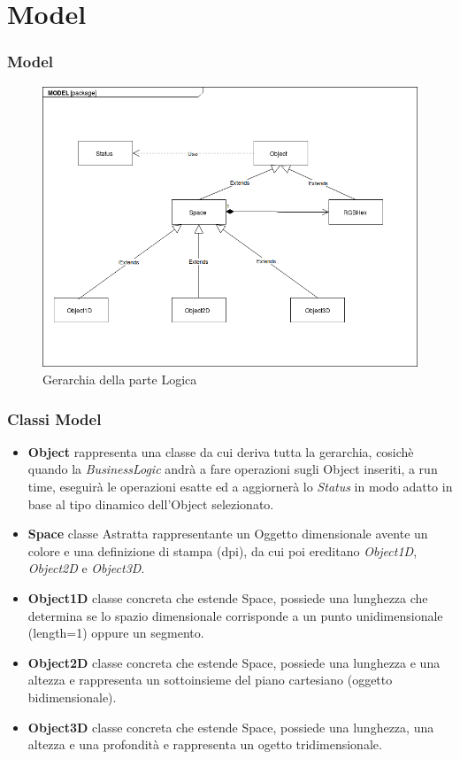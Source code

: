 \documentclass[10pt]{beamer}
\begin{document}
\section{Model}
\begin{frame}
\frametitle{Model}

   \FloatBarrier
   \begin{figure}[ht]
   \centering
   \includegraphics[scale=0.30]{Gerarchia.png}
   \caption{Gerarchia della parte Logica}
\end{figure}


\end{frame}


\begin{frame}
\frametitle{Classi Model}
\begin{itemize}
\item \textbf{Object} rappresenta una classe da cui deriva tutta la gerarchia, cosichè quando la \textit{BusinessLogic} andrà a fare operazioni sugli Object inseriti, a run time, eseguirà le operazioni esatte ed a aggiornerà lo \textit{Status} in modo adatto in base al tipo dinamico dell'Object selezionato.
\item \textbf{Space} classe Astratta rappresentante un Oggetto dimensionale avente un colore e una definizione di stampa (dpi), da cui poi ereditano \textit{Object1D}, \textit{Object2D} e \textit{Object3D}.
\item \textbf{Object1D} classe concreta che estende Space, possiede una lunghezza che determina se lo spazio dimensionale corrisponde a un punto unidimensionale (length=1) oppure un segmento.
\item \textbf{Object2D} classe concreta che estende Space, possiede una lunghezza e una altezza e rappresenta un sottoinsieme del piano cartesiano (oggetto bidimensionale).
\item \textbf{Object3D} classe concreta che estende Space, possiede una lunghezza, una altezza e una profondità e rappresenta un ogetto tridimensionale. 



\end{itemize}

\end{frame}
\end{document}
